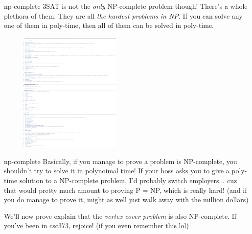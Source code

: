 \documentclass{beamer}
\begin{document}
\begin{frame}{np-complete}
3SAT is not the \textit{only} NP-complete problem though! There's a whole plethora of them. They are all \textit{the hardest problems in NP}. If you can solve any one of them in poly-time, then all of them can be solved in poly-time.

\begin{figure}[h]
\centering
\includegraphics[width=5cm]{img/np-complete.png}
\end{figure}

\end{frame}

\begin{frame}{np-complete}
Basically, if you manage to prove a problem is NP-complete, you shouldn't try to solve it in polynoimal time! If your boss asks you to give a poly-time solution to a NP-complete problem, I'd probably switch employers... cuz that would pretty much amount to proving P = NP, which is really hard! (and if you do manage to prove it, might as well just walk away with the million dollars)

\vspace{2mm}

We'll now prove explain that the \textit{vertex cover problem} is also NP-complete. If you've been in csc373, rejoice! (if you even remember this lol)
\end{frame}
\end{document}
